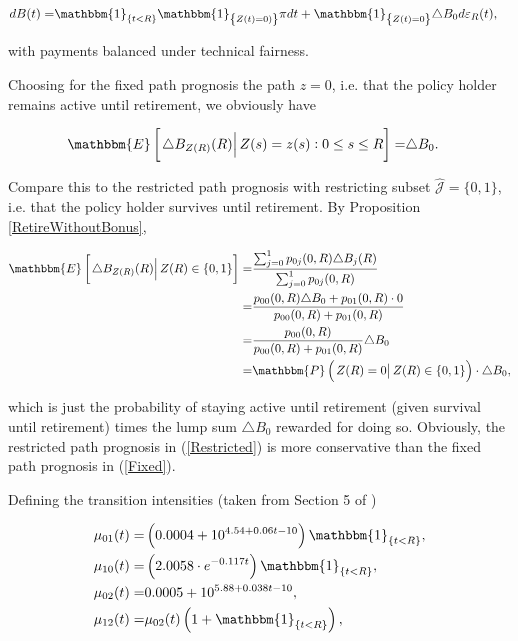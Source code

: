 \documentclass{article}
\newcommand{\1}[1]{\mathbbm{1}_{\left\lbrace #1 \right\rbrace}}
\newcommand{\econd}[2][def]{\mathbbm{E} \left[ \left. #1 \right| #2 \right]}
\newcommand{\pcond}[2][def]{\mathbbm{P} \left( \left. #1 \right| #2 \right)}
\theoremstyle{break}
\theoremstyle{remark}
\numberwithin{equation}{section}
\begin{document}
\begin{align*}
	dB(t) =& \1{t<R} \1{Z(t)=0)} \pi dt + \1{Z(t)=0} \triangle B_0 d \varepsilon_R(t),
\end{align*}

with payments balanced under technical fairness.

Choosing for the fixed path prognosis the path $z = 0$, i.e. that the policy holder remains active until retirement, we obviously have

\begin{align} \label{Fixed}
	\econd[\triangle B_{Z(R)}(R)]{Z(s) = z(s) : 0 \leq s \leq R} =& \triangle B_0.
\end{align}

Compare this to the restricted path prognosis with restricting subset $\hat{\mathcal{J}} = \{ 0,1 \}$, i.e. that the policy holder survives until retirement. By Proposition \ref{RetireWithoutBonus},

\begin{align} \label{Restricted}
\begin{split}
		\econd[\triangle B_{Z(R)} (R)]{Z(R) \in \{ 0,1 \}} =& \frac{\sum_{j = 0}^1 p_{0j}(0,R) \triangle B_j(R)}{\sum_{j = 0}^1 p_{0j}(0,R)} \\
	=&\frac{p_{00}(0,R) \triangle B_0 + p_{01}(0,R) \cdot 0}{p_{00}(0,R) + p_{01}(0,R)} \\
	=& \frac{p_{00}(0,R)}{p_{00}(0,R) + p_{01}(0,R)} \triangle B_0 \\
	=& \pcond[Z(R) = 0]{Z(R) \in \{ 0,1 \}} \cdot \triangle B_0,
\end{split}
\end{align}

which is just the probability of staying active until retirement (given survival until retirement) times the lump sum $\triangle B_0$ rewarded for doing so. Obviously, the restricted path prognosis in (\ref{Restricted}) is more conservative than the fixed path prognosis in (\ref{Fixed}).

Defining the transition intensities (taken from Section 5 of \cite{BuchardtMoller})

\begin{align} \label{Intensities}
\begin{split}
		\mu_{01}(t) =& \left(0.0004 + 10^{4.54 + 0.06t - 10}\right) \1{t<R}, \\
	\mu_{10}(t) =& \left(2.0058 \cdot e^{-0.117t}\right) \1{t<R}, \\
	\mu_{02}(t) =& 0.0005 + 10^{5.88 + 0.038t - 10}, \\
	\mu_{12}(t) =& \mu_{02}(t) \left( 1 + \1{t<R} \right),
\end{split}
\end{align}
\end{document}
